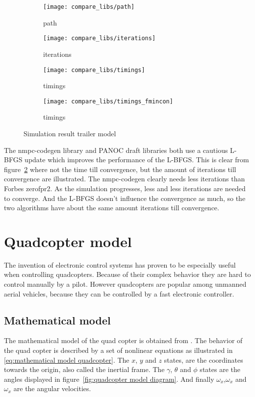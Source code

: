 \begin{figure}[H]
	\centering
	\begin{subfigure}[b]{0.45\textwidth}
		\centering
		\texttt{[image: compare\_libs/path]}
		\caption{path}
		\label{fig:solution path trailer example}
	\end{subfigure}
	\hfill
	\begin{subfigure}[b]{0.45\textwidth}
		\centering
		\texttt{[image: compare\_libs/iterations]}
		\caption{iterations}
		\label{fig:iterations trailer example}
	\end{subfigure}
	
	\begin{subfigure}[b]{0.45\textwidth}
		\centering
		\texttt{[image: compare\_libs/timings]}
		\caption{timings}
		\label{fig:timings trailer example}
	\end{subfigure}
	\hfill
	\begin{subfigure}[b]{0.45\textwidth}
		\centering
		\texttt{[image: compare\_libs/timings\_fmincon]}
		\caption{timings}
		\label{fig:timings fmincon Matlab trailer example}
	\end{subfigure}
	\caption{Simulation result trailer model}
	\label{fig:simulation result trailer model}
\end{figure}

The nmpc-codegen library and PANOC draft libraries both use a cautious L-BFGS update which improves the performance of the L-BFGS. This is clear from figure~\ref{fig:iterations trailer example} where not the time till convergence, but the amount of iterations till convergence are illustrated. The nmpc-codegen clearly needs less iterations than  Forbes zerofpr2. As the simulation progresses, less and less iterations are needed to converge. And the L-BFGS doesn't influence the convergence as much, so the two algorithms have about the same amount iterations till convergence.


\section{Quadcopter model}
The invention of electronic control systems has proven to be especially useful when controlling quadcopters. Because of their complex behavior they are hard to control manually by a pilot. However quadcopters are popular among unmanned aerial vehicles, because they can be controlled by a fast electronic controller.

\subsection{Mathematical model}
The mathematical model of the quad copter is obtained from \cite{Agudelo}. The behavior of the quad copter is described by a set of nonlinear equations as illustrated in \eqref{eq:mathematical model quadcopter}. The $x$, $y$ and $z$ states, are the coordinates towards the origin, also called the inertial frame. The $\gamma$, $\theta$ and $\phi$ states are the angles displayed in figure~\ref{fig:quadcopter model diagram}. And finally $\omega_x$,$\omega_x$ and $\omega_x$ are the angular velocities.

